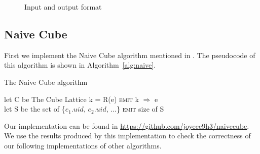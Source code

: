\documentclass{article}
\begin{document}
\begin{figure}[h]
\centering
{}
\caption{Input and output format}
\label{fig:example}
\end{figure}

\subsection{Naive Cube}

First we implement the Naive Cube algorithm mentioned in \cite{nandi2012data}. The pseudocode of this algorithm is shown in Algorithm~\ref{alg:naive}.

\begin{algorithm}[H]
\centering
\caption{The Naive Cube algorithm}
\label{alg:naive}
  \begin{algorithmic}[1]
      \State let C be The Cube Lattice
        	\State k = R(e)
        	\State \textsc{emit} k $\Rightarrow$ e
        \EndFor
      \EndFor
    \EndFunction
\\
      \State let S be the set of \{$e_{1}.uid$, $e_{2}.uid$, ...\}
      \State \textsc{emit} size of S
    \EndFunction
  \end{algorithmic}
\end{algorithm}

Our implementation can be found in \url{https://github.com/joyeec9h3/naivecube}. We use the results produced by this implementation to check the correctness of our following implementations of other algorithms.
\end{document}
